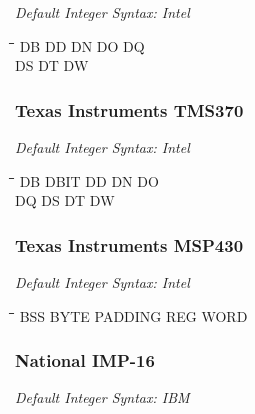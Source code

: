 {\em Default Integer Syntax: Intel}

{\tt\begin{tabbing}
\hspace{3cm}\=\hspace{3cm}\=\hspace{3cm}\=\hspace{3cm}\=\kill
DB         \> DD          \> DN          \> DO         \> DQ \\
DS         \> DT          \> DW \\
\end{tabbing}}

\subsubsection{Texas Instruments TMS370}

{\em Default Integer Syntax: Intel}

{\tt\begin{tabbing}
\hspace{3cm}\=\hspace{3cm}\=\hspace{3cm}\=\hspace{3cm}\=\kill
DB         \> DBIT        \> DD          \> DN          \> DO \\
DQ         \> DS          \> DT          \> DW \\
\end{tabbing}}

\subsubsection{Texas Instruments MSP430}

{\em Default Integer Syntax: Intel}

{\tt\begin{tabbing}
\hspace{3cm}\=\hspace{3cm}\=\hspace{3cm}\=\hspace{3cm}\=\kill
BSS        \> BYTE        \> PADDING     \> REG         \> WORD \\
\end{tabbing}}

\subsubsection{National IMP-16}

{\em Default Integer Syntax: IBM}

